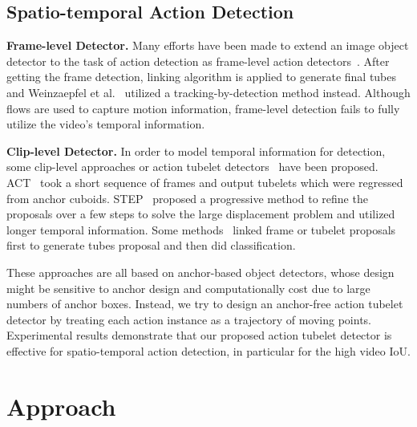 \documentclass[runningheads]{llncs}
\begin{document}
\subsection{Spatio-temporal Action Detection}

\textbf{Frame-level Detector.}
Many efforts have been made to extend an image object detector to the task of action detection as frame-level action detectors~\cite{gkioxari2015finding,Wang0TG16,peng2016multi,SahaSSTC16,singh2017online,weinzaepfel2015learning}. After getting the frame detection, linking
algorithm is applied to generate final tubes~\cite{gkioxari2015finding,Wang0TG16,peng2016multi,SahaSSTC16,singh2017online} and Weinzaepfel et al.~\cite{weinzaepfel2015learning} utilized a tracking-by-detection method instead. Although flows are used to capture motion information, frame-level detection fails to fully utilize the
video's temporal information.

\textbf{Clip-level Detector.}
In order to model temporal information for detection, some clip-level approaches or action tubelet detectors~\cite{kalogeiton2017action,hou2017tube,yang2019step,li2018recurrent,zhao2019dance,song2019tacnet} have been proposed. ACT~\cite{kalogeiton2017action} took a short sequence of frames and output tubelets which were regressed from anchor cuboids.
STEP~\cite{yang2019step} proposed a progressive method to refine the proposals over a few steps to solve the large displacement problem and utilized longer temporal information. Some methods~\cite{hou2017tube,li2018recurrent} linked frame or tubelet proposals first to generate tubes proposal and then did classification.

These approaches are all based on anchor-based object detectors, whose design might be sensitive to anchor design and computationally cost due to large numbers of anchor boxes. Instead, we try to design an anchor-free action tubelet detector by treating each action instance as a trajectory of moving points. Experimental results demonstrate that our proposed action tubelet detector is effective for spatio-temporal action detection, in particular for the high video IoU.

\section{Approach}
\end{document}
